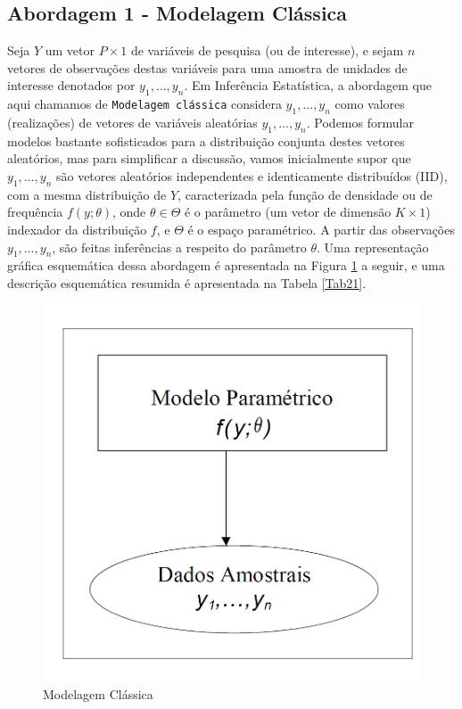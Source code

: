 \documentclass[]{book}
\theoremstyle{definition}
\theoremstyle{definition}
\theoremstyle{definition}
\theoremstyle{remark}
\begin{document}
\subsection{Abordagem 1 - Modelagem
Clássica}\label{abordagem-1---modelagem-classica}

Seja \(Y\) um vetor \(P \times 1\) de variáveis de pesquisa (ou de
interesse), e sejam \(n\) vetores de observações destas variáveis para
uma amostra de unidades de interesse denotados por \(y_1,\ldots ,y_n\).
Em Inferência Estatística, a abordagem que aqui chamamos de
\texttt{Modelagem\ clássica} considera \(y_1,\ldots ,y_n\) como valores
(realizações) de vetores de variáveis aleatórias \(y_1,\ldots ,y_n\).
Podemos formular modelos bastante sofisticados para a distribuição
conjunta destes vetores aleatórios, mas para simplificar a discussão,
vamos inicialmente supor que \(y_1,\ldots ,y_n\) são vetores aleatórios
independentes e identicamente distribuídos (IID), com a mesma
distribuição de \(Y\), caracterizada pela função de densidade ou de
frequência \(f(y;\theta)\), onde \(\theta \in \Theta\) é o parâmetro (um
vetor de dimensão \(K \times 1\)) indexador da distribuição \(f\), e
\(\Theta\) é o espaço paramétrico. A partir das observações
\(y_1,\ldots ,y_n\), são feitas inferências a respeito do parâmetro
\(\theta\). Uma representação gráfica esquemática dessa abordagem é
apresentada na Figura \ref{fig:modclas} a seguir, e uma descrição
esquemática resumida é apresentada na Tabela \ref{Tab21}.

\begin{figure}
\centering
\includegraphics{Figuras/fig21.png}
\caption{\label{fig:modclas}Modelagem Clássica}
\end{figure}
\end{document}
